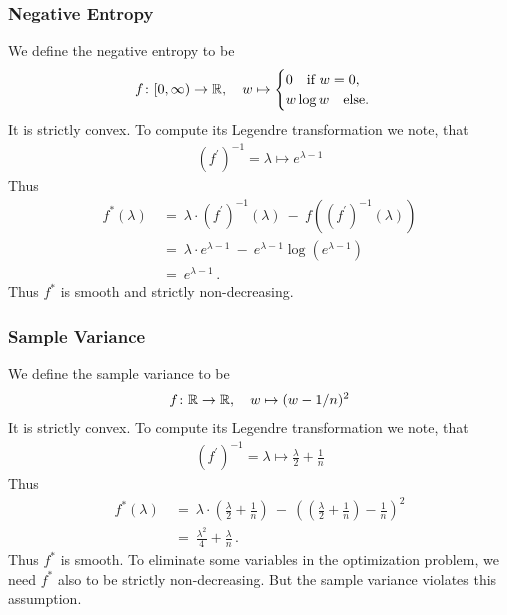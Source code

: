 \subsubsection*{Negative Entropy}
We define the negative entropy to be
\begin{gather}
  f
  \colon
  [0,\infty)
  \to
  \mathbb{R}
  ,\quad
  w
  \mapsto
  \begin{cases}
    0\quad\text{if}\ w=0,\\
    w\log w\quad
    \text{else}.
  \end{cases}
\end{gather}
It is strictly convex. To compute its Legendre transformation we note, that
\begin{gather}
  (f^{'})^{-1}
  =
  \lambda\mapsto
  e^{\lambda-1}
\end{gather}
Thus
  \begin{align*}
  f^*
  (\lambda)
  &
  \ 
  =
  \ 
  \lambda
    \cdot
    (f^{'})^{-1}(\lambda)
  \ 
    -
  \ 
    f
    \left( 
      (f^{'})^{-1}(\lambda)
    \right)
    \\
  &
  \ 
  =
  \ 
  \lambda
    \cdot
  e^{\lambda-1}
  \ 
    -
  \ 
  e^{\lambda-1}
  \log
  \left( 
  e^{\lambda-1}
  \right)
  \\
  &
  \ 
  =
  \ 
  e^{\lambda-1}
  \,.
  \end{align*}
  Thus $f^*$ is smooth and strictly non-decreasing.


  \subsubsection*{Sample Variance}
We define the sample variance to be
\begin{gather}
  f
  \colon
  \mathbb{R}
  \to
  \mathbb{R}
  ,\quad
  w
  \mapsto
  (w-1/n)^2
\end{gather}
It is strictly convex. To compute its Legendre transformation we note, that
\begin{gather}
  (f^{'})^{-1}
  =
  \lambda\mapsto
  \frac{\lambda}{2}
  +
  \frac{1}{n}
\end{gather}
Thus
  \begin{align*}
  f^*
  (\lambda)
  &
  \ 
  =
  \ 
  \lambda
    \cdot
    \left( 
  \frac{\lambda}{2}
  +
  \frac{1}{n}
    \right)
  \ 
    -
  \ 
    \left( 
    \left( 
  \frac{\lambda}{2}
  +
  \frac{1}{n}
    \right)
    -
    \frac{1}{n}
    \right)
    ^2
    \\
  &
  \ 
  =
  \ 
  \frac{\lambda^2}{4}
  +
  \frac{\lambda}{n}
  \,.
  \end{align*}
  Thus $f^*$ is smooth.
  To eliminate some variables in the optimization problem,
  we need $f^*$ also to be
  strictly non-decreasing. But the sample variance violates this assumption.



